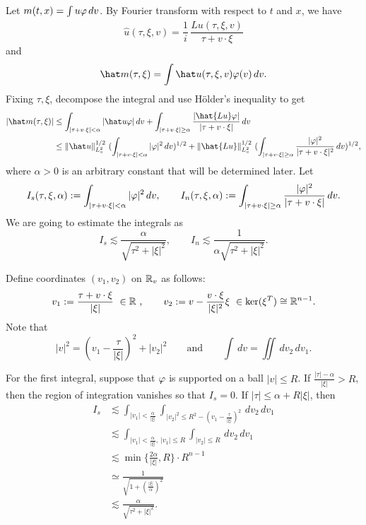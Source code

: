 \documentclass[12pt]{article}
\begin{document}
\begin{pf}
Let $m(t,x)=\int u\varphi\,dv$.
By Fourier transform with respect to $t$ and $x$, we have
\[\hat u(\tau,\xi,v)=\frac1i\,\frac{\hat{Lu}(\tau,\xi,v)}{\tau+v\cdot\xi}\]
and
\[\hat m(\tau,\xi)=\int\hat u(\tau,\xi,v)\f(v)\,dv.\]
Fixing $\tau,\xi$, decompose the integral and use H\"older's inequality to get
\begin{align*}
|\hat m(\tau,\xi)|
&\le\int_{|\tau+v\cdot\xi|<\alpha}|\hat u\f|\,dv+\int_{|\tau+v\cdot\xi|\ge\alpha}\frac{|\hat{Lu}\f|}{|\tau+v\cdot\xi|}\,dv\\
&\le\|\hat u\|_{L_v^2}^{1/2}\ (\int_{|\tau+v\cdot\xi|<\alpha}|\f|^2\,dv)^{1/2}+\|\hat{Lu}\|_{L_v^2}^{1/2}\ (\int_{|\tau+v\cdot\xi|\ge\alpha}\frac{|\f|^2}{|\tau+v\cdot\xi|^2}\,dv)^{1/2},
\end{align*}
where $\alpha>0$ is an arbitrary constant that will be determined later.
Let
\[I_s(\tau,\xi,\alpha):=\int_{|\tau+v\cdot\xi|<\alpha}|\varphi|^2\,dv,\qquad
I_n(\tau,\xi,\alpha):=\int_{|\tau+v\cdot\xi|\ge\alpha}\frac{|\varphi|^2}{|\tau+v\cdot\xi|}\,dv.\]
We are going to estimate the integrals as
\[I_s\lesssim\frac{\alpha}{\sqrt{\tau^2+|\xi|^2}},\qquad
I_n\lesssim\frac1{\alpha\sqrt{\tau^2+|\xi|^2}}.\]

Define coordinates $(v_1,v_2)$ on $\mathbb{R}_v$ as follows:
\[v_1:=\frac{\tau+v\cdot\xi}{|\xi|}\ \in\R\ ,\qquad v_2:=v-\frac{v\cdot\xi}{|\xi|^2}\xi\ \in\ker(\xi^T)\cong\R^{n-1}.\]
Note that
\[|v|^2=(v_1-\frac\tau{|\xi|})^2+|v_2|^2\qquad\text{and}\qquad\int\,dv=\iint\,dv_2\,dv_1.\]

For the first integral, suppose that $\varphi$ is supported on a ball $|v|\le R$.
If $\frac{|\tau|-\alpha}{|\xi|}>R$, then the region of integration vanishes so that $I_s=0$.
If $|\tau|\le\alpha+R|\xi|$, then
\begin{align*}
I_s&\lesssim\int_{|v_1|<\frac\alpha{|\xi|}}\int_{|v_2|^2\le R^2-(v_1-\frac\tau{|\xi|})^2}\,dv_2\,dv_1\\
&\lesssim\int_{|v_1|<\frac\alpha{|\xi|},\ |v_1|\le R}\int_{|v_2|\le R}\,dv_2\,dv_1\\
&\lesssim\min\{\frac{2\alpha}{|\xi|},R\}\cdot R^{n-1}\\
&\simeq\frac1{\sqrt{1+(\frac{|\xi|}\alpha)^2}}\\
&\lesssim\frac\alpha{\sqrt{\tau^2+|\xi|^2}}.
\end{align*}


\end{pf}
\end{document}

